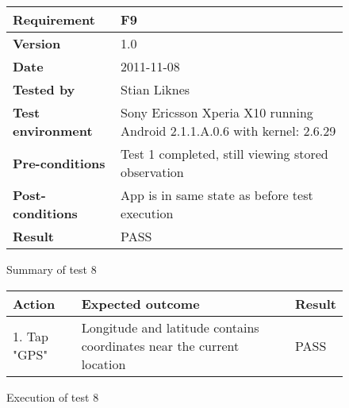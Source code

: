 	\begin{figure}[htb]
		\centering
		\begin{tabular}{|p{3.5cm}|p{7.0cm}|} \hline
			\textbf{Requirement} & F9 \\ \hline
			\textbf{Version} & 1.0 \\ \hline
			\textbf{Date} & 2011-11-08 \\ \hline
			\textbf{Tested by} & Stian Liknes \\ \hline
			\textbf{Test environment} & Sony Ericsson Xperia X10 running Android 2.1.1.A.0.6 with kernel: 2.6.29 \\ \hline
			\textbf{Pre-conditions} & Test 1 completed, still viewing stored observation \\ \hline
			\textbf{Post-conditions} & App is in same state as before test execution \\ \hline
			\textbf{Result} & PASS \\ \hline
		\end{tabular}
		\caption{Summary of test 8}
	\end{figure}

	\begin{figure}[htb]
		\centering
		\begin{tabular}{|p{5.0cm}|p{5.0cm}|p{1cm}|}
			\hline \textbf{Action} & \textbf{Expected outcome} & \textbf{Result} \\ \hline
			
			1. Tap "GPS" &
			Longitude and latitude contains coordinates near the current location &
			PASS \\ \hline

		\end{tabular}
		\caption{Execution of test 8}
	\end{figure}

\newpage
